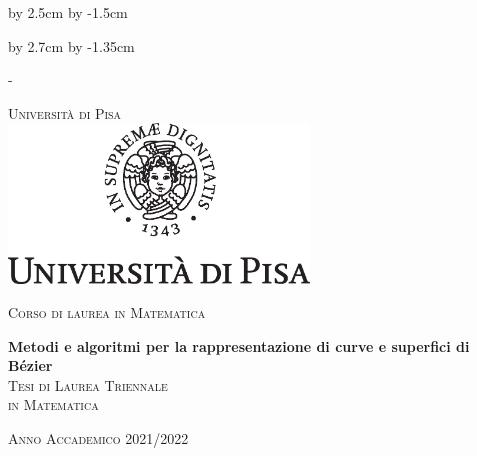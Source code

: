 \advance\vsize by 2.5cm %
\advance\voffset by -1.5cm %


\begin{titlingpage}


\advance\hsize by 2.7cm %
\advance\hoffset by -1.35cm %




\calccentering{\unitlength}
\begin{adjustwidth*}{\unitlength}{-\unitlength}


\thispagestyle{empty}
\begin{center}
\large
\textsc{\Large Università di Pisa\\}
\vspace{0.6cm}
\includegraphics[width=8cm]{cherubino.eps}

\vspace{0.8cm}
\textsc{\Large{Corso di laurea in Matematica}}\\



\vspace{2.5cm}


{\LARGE\textbf{Metodi e algoritmi per la rappresentazione di curve e superfici di Bézier}}
\\[2.0cm]

\textsc{Tesi di Laurea Triennale \\[0.2cm] in Matematica}\\
\vspace{0.5cm}

\begin{center}

\textsc{\Large Anno Accademico 2021/2022}
\end{center}

\vspace{0.2cm}

%
%


\end{center}
\end{adjustwidth*}
\end{titlingpage}
